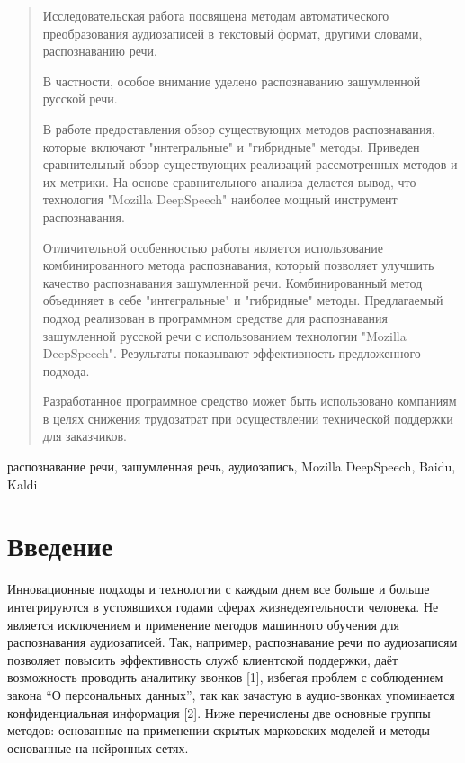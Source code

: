 \documentclass[conference]{IEEEtran}
\begin{document}
    \begin{abstract}
        Исследовательская работа посвящена методам автоматического преобразования аудиозаписей в текстовый формат, другими словами, распознаванию речи.

        В частности, особое внимание уделено распознаванию зашумленной русской речи.

        В работе предоставления обзор существующих методов распознавания, которые включают "интегральные" и "гибридные" методы.
        Приведен сравнительный обзор существующих реализаций рассмотренных методов и их метрики.
        На основе сравнительного анализа делается вывод, что технология "Mozilla DeepSpeech" наиболее мощный инструмент распознавания.

        Отличительной особенностью работы является использование комбинированного метода распознавания, который позволяет улучшить качество распознавания зашумленной речи.
        Комбинированный метод объединяет в себе "интегральные" и "гибридные" методы.
        Предлагаемый подход реализован в программном средстве для распознавания зашумленной русской речи с использованием технологии "Mozilla DeepSpeech".
        Результаты показывают эффективность предложенного подхода.

        Разработанное программное средство может быть использовано компаниям в целях снижения трудозатрат при осуществлении технической поддержки для заказчиков.
    \end{abstract}

    \begin{IEEEkeywords}
        распознавание речи, зашумленная речь, аудиозапись, Mozilla DeepSpeech, Baidu, Kaldi
    \end{IEEEkeywords}


    \section{Введение}

    Инновационные подходы и технологии с каждым днем все больше и больше интегрируются в устоявшихся годами сферах жизнедеятельности человека.
    Не является исключением и применение методов машинного обучения для распознавания аудиозаписей.
    Так, например, распознавание речи по аудиозаписям позволяет повысить эффективность служб клиентской поддержки, даёт возможность проводить аналитику звонков [1],
    избегая проблем с соблюдением закона “О персональных данных”, так как зачастую в аудио-звонках упоминается конфиденциальная информация [2].
    Ниже перечислены две основные группы методов: основанные на применении скрытых марковских моделей и методы основанные на нейронных сетях.
\end{document}
